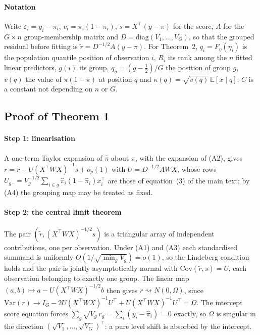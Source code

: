 \documentclass[11pt]{article}
\begin{document}
\paragraph{Notation} Write $\varepsilon_i=y_i-\pi_i$, $v_i=\pi_i(1-\pi_i)$, $s=X^\top(y-\pi)$ for
the score, $A$ for the $G\times n$ group-membership matrix and $D=\mathrm{diag}(V_1,\dots,V_G)$, so
that the grouped residual before fitting is $\tilde r=D^{-1/2}A(y-\pi)$. For
Theorem~2, $q_i=F_\eta(\eta_i)$ is the population quantile position of observation
$i$, $R_i$ its rank among the $n$ fitted linear predictors, $g(i)$ its group, $q_g=(g-\tfrac12)/G$
the position of group $g$, $v(q)$ the value of $\pi(1-\pi)$ at position $q$ and
$\kappa(q)=\sqrt{v(q)}\,\mathbb{E}[x\mid q]$; $C$ is a constant not depending on $n$ or $G$.

\subsection*{Proof of Theorem 1}

\paragraph{Step 1: linearisation} A one-term Taylor expansion of $\hat\pi$ about $\pi$, with the
expansion of (A2), gives $r=\tilde r-U(X^\top WX)^{-1}s+o_p(1)$ with $U=D^{-1/2}AWX$, whose rows
$U_{g\cdot}=V_g^{-1/2}\sum_{i\in g}\hat\pi_i(1-\hat\pi_i)x_i^\top$ are those of equation~(3) of the
main text; by (A4) the grouping map may be treated as fixed.

\paragraph{Step 2: the central limit theorem} The pair $(\tilde r,(X^\top WX)^{-1/2}s)$ is a
triangular array of independent contributions, one per observation. Under (A1) and (A3) each
standardised summand is uniformly $O(1/\sqrt{\min_gV_g})=o(1)$, so the Lindeberg condition holds and
the pair is jointly asymptotically normal with $\mathrm{Cov}(\tilde r,s)=U$, each observation
belonging to exactly one group. The linear map $(a,b)\mapsto a-U(X^\top WX)^{-1/2}b$ then gives
$r\rightsquigarrow N(0,\Omega)$, since
$\mathrm{Var}(r)\to I_G-2U(X^\top WX)^{-1}U^\top+U(X^\top WX)^{-1}U^\top=\Omega$. The intercept score
equation forces $\sum_g\sqrt{V_g}\,r_g=\sum_i(y_i-\hat\pi_i)=0$ exactly, so $\Omega$ is singular in
the direction $(\sqrt{V_1},\dots,\sqrt{V_G})^\top$: a pure level shift is absorbed by the intercept.
\end{document}
